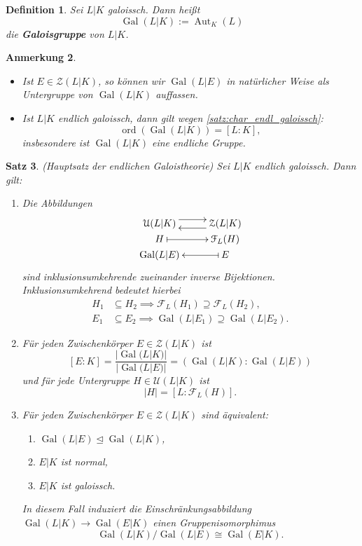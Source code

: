 \documentclass[a4paper, twoside, 11pt, ngerman]{report}
\newcommand{\calF}{\mathcal F}
\newcommand{\calU}{\mathcal U}
\newcommand{\calZ}{\mathcal Z}
\DeclareMathOperator{\Aut}{Aut}
\DeclareMathOperator{\Gal}{Gal}
\DeclareMathOperator{\ord}{ord}
\theoremstyle{definistyle}
\newtheorem{satz}{Satz}[section]
\newtheorem{defini}[satz]{Definition}
\newtheorem{anm}[satz]{Anmerkung}
\theoremstyle{remark}
\newcommand{\defn}[1]{\textit{\bfseries #1}}
\begin{document}
\begin{defini}\label{def:galoisgruppe}
Sei $L|K$ galoissch. Dann heißt
\[
\Gal(L|K) := \Aut_K(L)
\]
die \defn{Galoisgruppe} von $L|K$.
\end{defini}

\begin{anm}\label{anm:galois_ordnung_grad}
\begin{itemize}
\item Ist $E\in\calZ(L|K)$, so können wir $\Gal(L|E)$ in natürlicher Weise als Untergruppe von $\Gal(L|K)$ auffassen.
\item Ist $L|K$ endlich galoissch, dann gilt wegen \ref{satz:char_endl_galoissch}:
\[
\ord(\Gal(L|K)) = [L : K],
\]
insbesondere ist $\Gal(L|K)$ eine endliche Gruppe.
\end{itemize}
\end{anm}

\begin{satz}\label{satz:hauptsatz_galoistheorie}
(Hauptsatz der endlichen Galoistheorie)  
Sei $L|K$ endlich galoissch. Dann gilt:
\begin{enumerate}
\item[(a)] Die Abbildungen
\[
\xymatrix@R=0cm
{
\calU(L|K)  \ar@<1ex>[r] &  \calZ(L|K) \ar@<1ex>[l] \\
H \ar@{|->}[r] & \calF_L(H) \\
\Gal(L|E) & \ar@{|-{>}}[l] E
}
\]
sind inklusionsumkehrende zueinander inverse Bijektionen. Inklusionsumkehrend bedeutet hierbei 
\begin{align*}
H_1 & \subseteq H_2 \implies \calF_L(H_1) \supseteq \calF_L(H_2), \\
E_1 & \subseteq E_2 \implies \Gal(L|E_1)\supseteq \Gal(L|E_2).
\end{align*}

\item[(b)] Für jeden Zwischenkörper $E \in \calZ(L|K)$ ist
\[
[E : K] = \frac{|\Gal(L|K)|}{|\Gal(L|E)|} = (\Gal(L|K):\Gal(L|E))
\]
und für jede Untergruppe $H\in\calU(L|K)$ ist
\[
|H| = [L:\calF_L(H)].
\]
\item[(c)] Für jeden Zwischenkörper $E \in \calZ(L|K)$ sind äquivalent:
    \begin{enumerate}
        \item[(i)] $\Gal(L|E) \trianglelefteq \Gal(L|K)$,
        \item[(ii)] $E|K$ ist normal,
        \item[(iii)] $E|K$ ist galoissch.
    \end{enumerate}
    In diesem Fall induziert die Einschränkungsabbildung $\Gal(L|K) \to \Gal(E|K)$ einen
    Gruppen\-iso\-morphimus
    \[
    \Gal(L|K) / \Gal(L|E) \cong \Gal(E|K).
    \]
\end{enumerate}
\end{satz}
\end{document}
